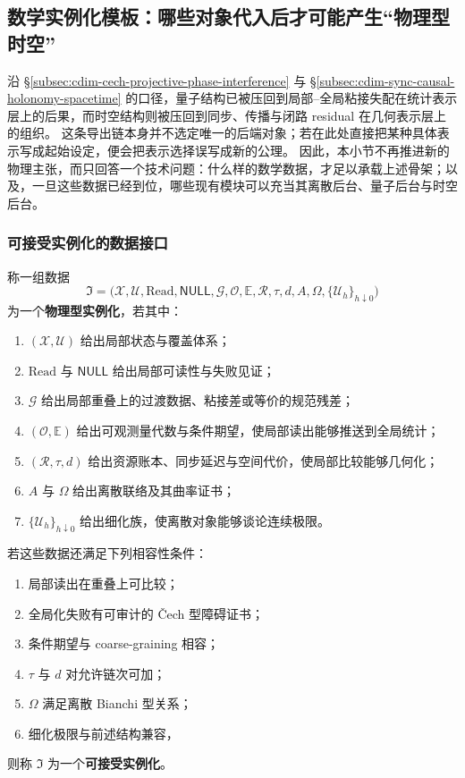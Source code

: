 \subsection{数学实例化模板：哪些对象代入后才可能产生“物理型时空”}\label{subsec:physical-spacetime-skeleton-instantiation-template}

沿 \S\ref{subsec:cdim-cech-projective-phase-interference} 与 \S\ref{subsec:cdim-sync-causal-holonomy-spacetime} 的口径，量子结构已被压回到局部--全局粘接失配在统计表示层上的后果，而时空结构则被压回到同步、传播与闭路 residual 在几何表示层上的组织。
这条导出链本身并不选定唯一的后端对象；若在此处直接把某种具体表示写成起始设定，便会把表示选择误写成新的公理。
因此，本小节不再推进新的物理主张，而只回答一个技术问题：什么样的数学数据，才足以承载上述骨架；以及，一旦这些数据已经到位，哪些现有模块可以充当其离散后台、量子后台与时空后台。

\subsubsection{可接受实例化的数据接口}

\begin{definition}[物理型实例化]\label{def:physical-spacetime-acceptable-instantiation}
称一组数据
\[
\mathfrak I=
\bigl(
\mathcal X,\mathcal U,\mathrm{Read},\mathsf{NULL},
\mathcal G,\mathcal O,\mathbb E,
\mathcal R,\tau,d,
A,\Omega,\{\mathcal U_h\}_{h\downarrow 0}
\bigr)
\]
为一个\textbf{物理型实例化}，若其中：
\begin{enumerate}
  \item \((\mathcal X,\mathcal U)\) 给出局部状态与覆盖体系；
  \item \(\mathrm{Read}\) 与 \(\mathsf{NULL}\) 给出局部可读性与失败见证；
  \item \(\mathcal G\) 给出局部重叠上的过渡数据、粘接差或等价的规范残差；
  \item \((\mathcal O,\mathbb E)\) 给出可观测量代数与条件期望，使局部读出能够推送到全局统计；
  \item \((\mathcal R,\tau,d)\) 给出资源账本、同步延迟与空间代价，使局部比较能够几何化；
  \item \(A\) 与 \(\Omega\) 给出离散联络及其曲率证书；
  \item \(\{\mathcal U_h\}_{h\downarrow 0}\) 给出细化族，使离散对象能够谈论连续极限。
\end{enumerate}
若这些数据还满足下列相容性条件：
\begin{enumerate}
  \item 局部读出在重叠上可比较；
  \item 全局化失败有可审计的 \v{C}ech 型障碍证书；
  \item 条件期望与 coarse-graining 相容；
  \item \(\tau\) 与 \(d\) 对允许链次可加；
  \item \(\Omega\) 满足离散 Bianchi 型关系；
  \item 细化极限与前述结构兼容，
\end{enumerate}
则称 \(\mathfrak I\) 为一个\textbf{可接受实例化}。
\end{definition}

